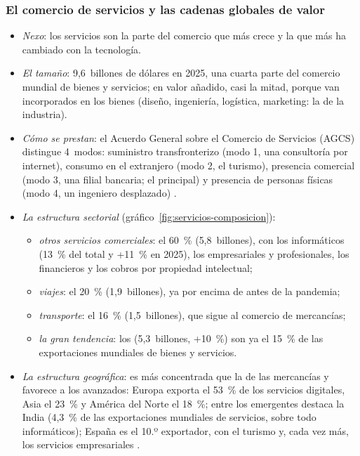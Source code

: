 \documentclass[11pt]{article}
\begin{document}
\subsubsection{El comercio de servicios y las cadenas globales de valor}\label{sec:servicios}

\begin{itemize}
\item \emph{Nexo}: los servicios son la parte del comercio que más crece y la que más ha cambiado con la tecnología.
\item \emph{El tamaño}: 9,6~billones de dólares en 2025, una cuarta parte del comercio mundial de bienes y servicios; en valor añadido, casi la mitad, porque van incorporados en los bienes (diseño, ingeniería, logística, marketing: la  de la industria)\nocite{OMC2026GTOS}.
\item \emph{Cómo se prestan}: el Acuerdo General sobre el Comercio de Servicios (AGCS) distingue 4~modos: suministro transfronterizo (modo 1, una consultoría por internet), consumo en el extranjero (modo 2, el turismo), presencia comercial (modo 3, una filial bancaria; el principal) y presencia de personas físicas (modo 4, un ingeniero desplazado) .
\item \emph{La estructura sectorial} (gráfico~\ref{fig:servicios-composicion}):
  \begin{itemize}
  \item \emph{otros servicios comerciales}: el 60~\% (5,8~billones), con los informáticos (13~\% del total y +11~\% en 2025), los empresariales y profesionales, los financieros y los cobros por propiedad intelectual\nocite{OMC2026GTOS};
  \item \emph{viajes}: el 20~\% (1,9~billones), ya por encima de antes de la pandemia\nocite{OMC2026GTOS};
  \item \emph{transporte}: el 16~\% (1,5~billones), que sigue al comercio de mercancías\nocite{OMC2026GTOS};
  \item \emph{la gran tendencia}: los  (5,3~billones, +10~\%) son ya el 15~\% de las exportaciones mundiales de bienes y servicios\nocite{OMC2026GTOS}.
  \end{itemize}
\item \emph{La estructura geográfica}: es más concentrada que la de las mercancías y favorece a los avanzados: Europa exporta el 53~\% de los servicios digitales, Asia el 23~\% y América del Norte el 18~\%; entre los emergentes destaca la India (4,3~\% de las exportaciones mundiales de servicios, sobre todo informáticos); España es el 10.º exportador, con el turismo y, cada vez más, los servicios empresariales  .
\end{itemize}
\end{document}
